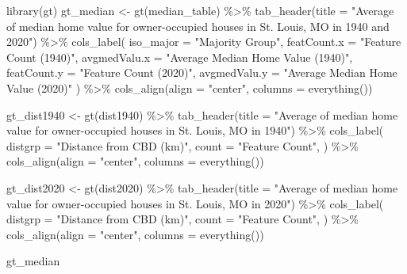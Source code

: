 \documentclass[
]{article}
\newenvironment{Shaded}{\begin{snugshade}}{\end{snugshade}}
\newcommand{\AttributeTok}[1]{\textcolor[rgb]{0.77,0.63,0.00}{#1}}
\newcommand{\FunctionTok}[1]{\textcolor[rgb]{0.00,0.00,0.00}{#1}}
\newcommand{\NormalTok}[1]{#1}
\newcommand{\OtherTok}[1]{\textcolor[rgb]{0.56,0.35,0.01}{#1}}
\newcommand{\SpecialCharTok}[1]{\textcolor[rgb]{0.00,0.00,0.00}{#1}}
\newcommand{\StringTok}[1]{\textcolor[rgb]{0.31,0.60,0.02}{#1}}
\begin{document}
\begin{Shaded}
\begin{Highlighting}[]
\FunctionTok{library}\NormalTok{(gt)}
\NormalTok{gt\_median }\OtherTok{\textless{}{-}} \FunctionTok{gt}\NormalTok{(median\_table) }\SpecialCharTok{\%\textgreater{}\%}
  \FunctionTok{tab\_header}\NormalTok{(}\AttributeTok{title =} \StringTok{"Average of median home value for owner{-}occupied houses in St. Louis, MO in 1940 and 2020"}\NormalTok{) }\SpecialCharTok{\%\textgreater{}\%}
  \FunctionTok{cols\_label}\NormalTok{(}
    \AttributeTok{iso\_major =} \StringTok{"Majority Group"}\NormalTok{,}
    \AttributeTok{featCount.x =} \StringTok{"Feature Count (1940)"}\NormalTok{,}
    \AttributeTok{avgmedValu.x =} \StringTok{"Average Median Home Value (1940)"}\NormalTok{, }
    \AttributeTok{featCount.y =} \StringTok{"Feature Count (2020)"}\NormalTok{, }
    \AttributeTok{avgmedValu.y =} \StringTok{"Average Median Home Value (2020)"}
\NormalTok{  ) }\SpecialCharTok{\%\textgreater{}\%}
  \FunctionTok{cols\_align}\NormalTok{(}\AttributeTok{align =} \StringTok{"center"}\NormalTok{, }\AttributeTok{columns =} \FunctionTok{everything}\NormalTok{())}

\NormalTok{gt\_dist1940 }\OtherTok{\textless{}{-}} \FunctionTok{gt}\NormalTok{(dist1940) }\SpecialCharTok{\%\textgreater{}\%}
  \FunctionTok{tab\_header}\NormalTok{(}\AttributeTok{title =} \StringTok{"Average of median home value for owner{-}occupied houses in St. Louis, MO in 1940"}\NormalTok{) }\SpecialCharTok{\%\textgreater{}\%}
  \FunctionTok{cols\_label}\NormalTok{(}
    \AttributeTok{distgrp =} \StringTok{"Distance from CBD (km)"}\NormalTok{,}
    \AttributeTok{count =} \StringTok{"Feature Count"}\NormalTok{,}
\NormalTok{  ) }\SpecialCharTok{\%\textgreater{}\%}
  \FunctionTok{cols\_align}\NormalTok{(}\AttributeTok{align =} \StringTok{"center"}\NormalTok{, }\AttributeTok{columns =} \FunctionTok{everything}\NormalTok{())}

\NormalTok{gt\_dist2020 }\OtherTok{\textless{}{-}} \FunctionTok{gt}\NormalTok{(dist2020) }\SpecialCharTok{\%\textgreater{}\%}
  \FunctionTok{tab\_header}\NormalTok{(}\AttributeTok{title =} \StringTok{"Average of median home value for owner{-}occupied houses in St. Louis, MO in 2020"}\NormalTok{) }\SpecialCharTok{\%\textgreater{}\%}
  \FunctionTok{cols\_label}\NormalTok{(}
    \AttributeTok{distgrp =} \StringTok{"Distance from CBD (km)"}\NormalTok{,}
    \AttributeTok{count =} \StringTok{"Feature Count"}\NormalTok{,}
\NormalTok{  ) }\SpecialCharTok{\%\textgreater{}\%}
  \FunctionTok{cols\_align}\NormalTok{(}\AttributeTok{align =} \StringTok{"center"}\NormalTok{, }\AttributeTok{columns =} \FunctionTok{everything}\NormalTok{())}

\NormalTok{gt\_median}
\end{Highlighting}
\end{Shaded}
\end{document}
